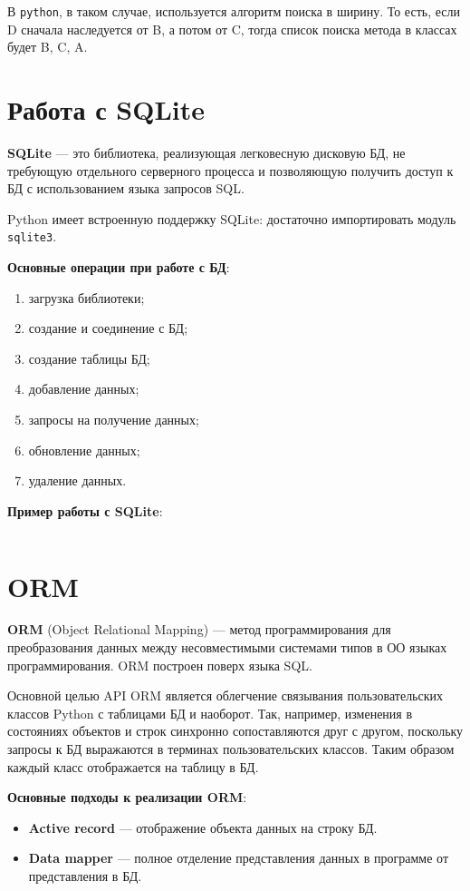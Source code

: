 \documentclass[a4paper,12pt,oneside]{extbook}
\begin{document}
В \texttt{python}, в таком случае, используется алгоритм поиска в ширину. То есть, если D сначала наследуется от B, а потом от C, тогда список поиска метода в классах будет B, C, A.

\section{Работа с SQLite}%
\label{sec:Работа с SQLite}

\textbf{SQLite} — это библиотека, реализующая легковесную дисковую БД, не требующую отдельного серверного процесса и позволяющую получить доступ к БД с использованием языка запросов SQL.

Python имеет встроенную поддержку SQLite: достаточно импортировать модуль \texttt{sqlite3}.

\textbf{Основные операции при работе с БД}:
\begin{enumerate}
    \item загрузка библиотеки;
    \item создание и соединение с БД;
    \item создание таблицы БД;
    \item добавление данных;
    \item запросы на получение данных;
    \item обновление данных;
    \item удаление данных.
\end{enumerate}

\textbf{Пример работы с SQLite}:
\inputminted{python}{./examples/sqlite_conn.py}

\section{ORM}%
\label{sec:ORM}

\textbf{ORM} (Object Relational Mapping) — метод программирования для преобразования данных между несовместимыми системами типов в ОО языках программирования. ORM построен поверх языка SQL.

Основной целью API ORM является облегчение связывания пользовательских классов Python с таблицами БД и наоборот. Так, например, изменения в состояниях объектов и строк синхронно сопоставляются друг с другом, поскольку запросы к БД выражаются в терминах пользовательских классов. Таким образом каждый класс отображается на таблицу в БД.

\textbf{Основные подходы к реализации ORM}:
\begin{itemize}
    \item \textbf{Active record} — отображение объекта данных на строку БД.
    \item \textbf{Data mapper} — полное отделение представления данных в программе от представления в БД.
\end{itemize}
\end{document}
